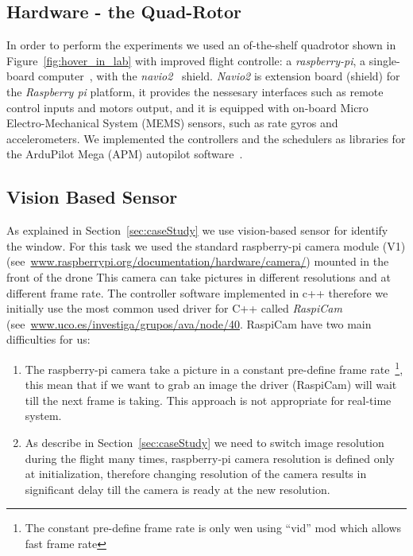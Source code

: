 \documentclass[ twoside, 12pt ]{article}
\begin{document}
\subsection{Hardware - the Quad-Rotor}
\label{sec:Experiment setup-HW}

In order to perform the experiments we used an of-the-shelf quadrotor shown in Figure~\ref{fig:hover_in_lab} with improved flight controlle: a \textit{raspberry-pi}, a single-board computer~\cite{raspberry}, with the \textit{navio2}~\cite{navio} shield.
\textit{Navio2} is extension board (shield) for the \textit{Raspberry pi} platform, it provides the nessesary interfaces such as remote control inputs and motors output, and it is equipped with on-board Micro Electro-Mechanical System (MEMS) sensors, such as rate gyros and accelerometers.
We implemented the controllers and the schedulers as libraries for the ArduPilot Mega (APM) autopilot software~\cite{APM}.

\subsection{Vision Based Sensor}
\label{sec:Experiment setup-cam}
As explained in Section~\ref{sec:caseStudy} we use vision-based sensor for identify the window.
For this task we used the standard raspberry-pi camera module (V1) (see~\url{www.raspberrypi.org/documentation/hardware/camera/}) mounted in the front of the drone
This camera can take pictures in different resolutions and at different frame rate.
The controller software implemented in c++ therefore we initially use the most common used driver for C++ called  \textit{RaspiCam} (see~\url{www.uco.es/investiga/grupos/ava/node/40}.
RaspiCam have two main difficulties for us:
\begin{enumerate}
    \item The raspberry-pi camera take a picture in a constant pre-define frame rate~\footnote{The constant pre-define frame rate is only wen using ``vid'' mod which allows fast frame rate}, this mean that if we want to grab an image the driver (RaspiCam) will wait till the next frame is taking. This approach is not appropriate for real-time system.
    \item As describe in Section~\ref{sec:caseStudy} we need to switch image resolution during the flight many times, raspberry-pi camera resolution is defined only at initialization, therefore changing resolution of the camera results in significant delay till the camera is ready at the new resolution.
\end{enumerate} 
\end{document}

